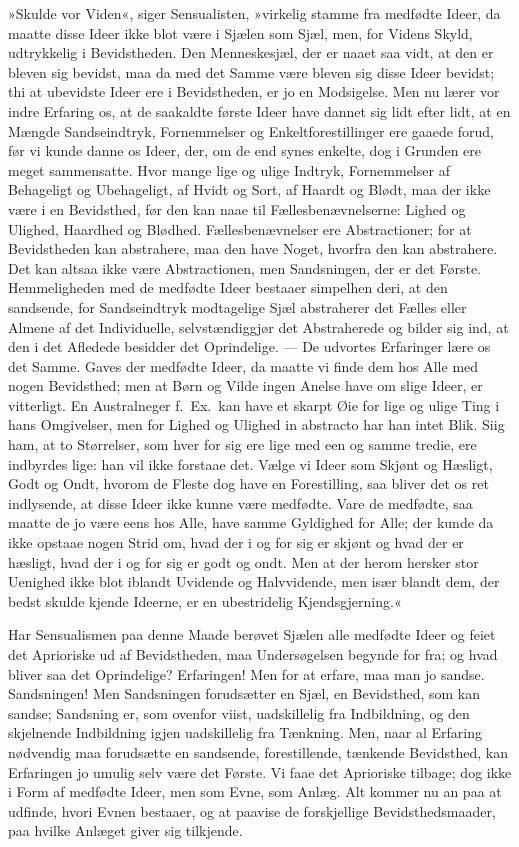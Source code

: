 \documentclass[12pt]{book}
\newcommand{\apage}[1]{\marginnote{\footnotesize\textit{[#1]}}}
\begin{document}
»Skulde vor Viden«, siger Sensualisten, »virkelig stamme fra medfødte
Ideer, da maatte disse Ideer ikke blot være i Sjælen som Sjæl, men, for
Videns Skyld, udtrykkelig i Bevidstheden. Den Menneskesjæl, der er naaet
saa vidt, at den er bleven sig bevidst, maa da med det Samme være bleven
sig disse Ideer bevidst; thi at ubevidste Ideer ere i Bevidstheden, er jo
en Modsigelse. Men nu lærer vor indre Erfaring os, at de saakaldte første
Ideer have dannet sig lidt efter lidt, at en Mængde Sandseindtryk,
Fornemmelser og Enkeltforestillinger ere gaaede forud, før vi kunde danne
os Ideer, der, om de end synes enkelte, dog i Grunden ere meget
sammensatte. Hvor mange lige og ulige Indtryk, Fornemmelser af Behageligt
og Ubehageligt, af Hvidt og Sort, af Haardt og Blødt, maa der ikke være i
en Bevidsthed, før den kan naae til Fællesbenævnelserne: Lighed og
Ulighed, Haardhed og Blødhed. Fællesbenævnelser ere Abstractioner; for at
Bevidstheden kan abstrahere, maa den have Noget, hvorfra den kan
abstrahere. Det kan altsaa ikke være Abstractionen, men Sandsningen, der
er det Første. Hemmeligheden med de medfødte Ideer bestaaer simpelhen
deri, at den sandsende, for Sandseindtryk modtagelige Sjæl abstraherer det
Fælles eller Almene af det Individuelle, selvstændiggjør det Abstraherede
og bilder sig ind, at den i det Afledede besidder det Oprindelige. --- De
udvortes Erfaringer lære os det Samme. Gaves der medfødte Ideer, da maatte
vi \apage{32} finde dem hos Alle med nogen Bevidsthed; men at Børn og Vilde ingen
Anelse have om slige Ideer, er vitterligt. En Australneger f.\ Ex.\ kan
have et skarpt Øie for lige og ulige Ting i hans Omgivelser, men for
Lighed og Ulighed in abstracto har han intet Blik. Siig ham, at
to Størrelser, som hver for sig ere lige med een og samme tredie, ere
indbyrdes lige: han vil ikke forstaae det. Vælge vi Ideer som Skjønt og
Hæsligt, Godt og Ondt, hvorom de Fleste dog have en Forestilling, saa
bliver det os ret indlysende, at disse Ideer ikke kunne være medfødte.
Vare de medfødte, saa maatte de jo være eens hos Alle, have samme
Gyldighed for Alle; der kunde da ikke opstaae nogen Strid om, hvad der i
og for sig er skjønt og hvad der er hæsligt, hvad der i og for sig er godt
og ondt. Men at der herom hersker stor Uenighed ikke blot iblandt Uvidende
og Halvvidende, men især blandt dem, der bedst skulde kjende Ideerne, er en
ubestridelig Kjendsgjerning.«

Har Sensualismen paa denne Maade berøvet Sjælen alle medfødte Ideer og
feiet det Aprioriske ud af Bevidstheden, maa Undersøgelsen begynde for
fra; og hvad bliver saa det Oprindelige? Erfaringen! Men for at erfare,
maa man jo sandse. Sandsningen! Men Sandsningen forudsætter en Sjæl, en
Bevidsthed, som kan sandse; Sandsning er, som ovenfor viist, uadskillelig
fra Indbildning, og den skjelnende Indbildning igjen uadskillelig fra
Tænkning. Men, naar al Erfaring nødvendig maa forudsætte en sandsende,
forestillende, tænkende Bevidsthed, kan Erfaringen jo umulig selv \apage{33} være det
Første. Vi faae det Aprioriske tilbage; dog ikke i Form af medfødte Ideer,
men som Evne, som Anlæg. Alt kommer nu an paa at udfinde, hvori Evnen
bestaaer, og at paavise de forskjellige Bevidsthedsmaader, paa hvilke
Anlæget giver sig tilkjende.
\end{document}
